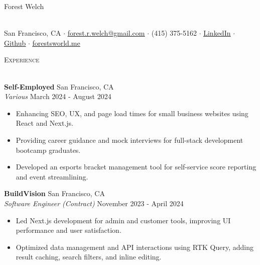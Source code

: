 \documentclass[a4paper]{article}
\newcommand{\header}[1]{
    {\hspace*{-18pt}\vspace*{3pt} \textcolor{deeppurple}{\textsc{#1}}}
    \vspace*{-12pt} \\
    \hspace*{-18pt} \textcolor{deeppurple}{\hrulefill} \\
}
\begin{document}
\vspace{-40pt}

\begin{center}
    \begin{minipage}{\textwidth}
        \centering
        {\fontsize{36}{36}\selectfont \textcolor{deeppurple}{Forest Welch}}
        \hspace{0.3cm}
    \end{minipage}
    \\ %
    \vspace{10pt} %
    \small San Francisco, CA $\cdot$ \href{mailto:forest.r.welch@gmail.com}{\underline{forest.r.welch@gmail.com}} $\cdot$ (415) 375-5162 $\cdot$ \href{https://linkedin.com/in/forestrwelch}{\underline{LinkedIn}} $\cdot$ \href{https://github.com/nwelchr}{\underline{Github}} $\cdot$ \href{https://forestsworld.me/}{\underline{forestsworld.me}}
\end{center}

\header{Experience}
\vspace{1mm}

\textbf{Self-Employed} \hfill San Francisco, CA\\
\textit{Various} \hfill March 2024 - August 2024\\
\vspace{-1mm}
\begin{itemize} \itemsep .5pt
    \item Enhancing SEO, UX, and page load times for small business websites using React and Next.js.
    \item Providing career guidance and mock interviews for full-stack development bootcamp graduates.
    \item Developed an esports bracket management tool for self-service score reporting and event streamlining.
\end{itemize}

\textbf{BuildVision} \hfill San Francisco, CA\\
\textit{Software Engineer (Contract)} \hfill November 2023 - April 2024\\
\vspace{-1mm}
\begin{itemize} \itemsep .5pt
    \item Led Next.js development for admin and customer tools, improving UI performance and user satisfaction.
    \item Optimized data management and API interactions using RTK Query, adding result caching, search filters, and inline editing.
\end{itemize}
\end{document}
